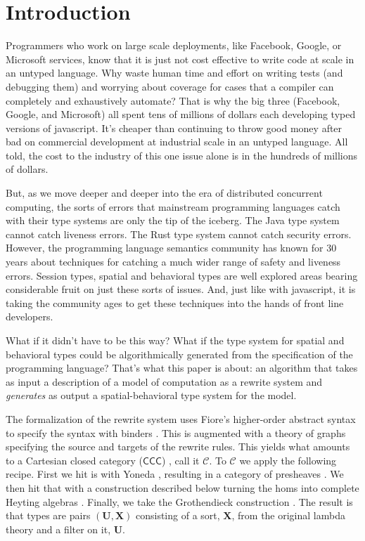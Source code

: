 \section{Introduction}\label{sec:introduction} %

Programmers who work on large scale deployments, like Facebook,
Google, or Microsoft services, know that it is just not cost effective
to write code at scale in an untyped language. Why waste human time
and effort on writing tests (and debugging them) and worrying about
coverage for cases that a compiler can completely and exhaustively
automate? That is why the big three (Facebook, Google, and Microsoft)
\cite{chauduri_2017} \cite{DBLP:conf/oopsla/Bak15} \cite{guo_2022} all
spent tens of millions of dollars each developing typed versions of
javascript. It's cheaper than continuing to throw good money after bad
on commercial development at industrial scale in an untyped
language. All told, the cost to the industry of this one issue alone
is in the hundreds of millions of dollars.

But, as we move deeper and deeper into the era of distributed
concurrent computing, the sorts of errors that mainstream programming
languages catch with their type systems are only the tip of the
iceberg. The Java type system cannot catch liveness errors. The Rust
type system cannot catch security errors. However, the programming
language semantics community has known for 30 years about techniques
for catching a much wider range of safety and liveness errors. Session
types, spatial and behavioral types are well explored areas bearing
considerable fruit on just these sorts of issues. And, just like with
javascript, it is taking the community ages to get these techniques
into the hands of front line developers.

What if it didn't have to be this way? What if the type system for
spatial and behavioral types could be algorithmically generated from
the specification of the programming language? That's what this paper
is about: an algorithm that takes as input a description of a model of
computation as a rewrite system and \emph{generates} as output a
spatial-behavioral type system for the model.

The formalization of the rewrite system uses Fiore's higher-order
abstract syntax to specify the syntax with binders
\cite{DBLP:conf/csl/FioreH10} \cite{DBLP:conf/mfcs/FioreM10}. This is
augmented with a theory of graphs specifying the source and targets of
the rewrite rules. This yields what amounts to a Cartesian closed
category ($\mathsf{CCC}$) \cite{lambek1988introduction}, call it
$\mathcal{C}$. To $\mathcal{C}$ we apply the following recipe. First
we hit is with Yoneda \cite{DBLP:books/daglib/0068767}, resulting in a
category of presheaves \cite{maclane2012sheaves}. We then hit that
with a construction described below turning the homs into complete
Heyting algebras \cite{johnstone1982stone}. Finally, we take the
Grothendieck construction \cite{maclane2012sheaves}. The result is
that types are pairs $(\mathbf{U}, \mathbf{X})$ consisting of a sort,
$\mathbf{X}$, from the original lambda theory and a filter on it,
$\mathbf{U}$.

